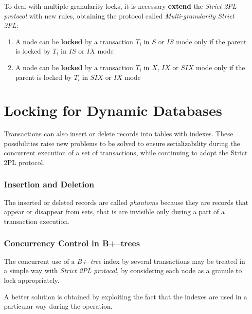 To deal with multiple granularity locks, it is necessary \textbf{extend} the \textit{Strict 2PL protocol} with new rules, obtaining the protocol called \textit{Multi-granularity Strict 2PL}:
\begin{enumerate}
    \item A node can be \textbf{locked} by a transaction $T_i$ in $S$ or $IS$ mode only if the parent is locked by $T_i$ in $IS$ or $IX$ mode
    \item A node can be \textbf{locked} by a transaction $T_i$ in $X$, $IX$ or $SIX$ mode only if the parent is locked by $T_i$ in $SIX$ or $IX$ mode
\end{enumerate}

\section{Locking for Dynamic Databases}
Transactions can also insert or delete records into tables with indexes. These possibilities raise new problems to be solved to ensure serializability during the concurrent execution of a set of transactions, while continuing to adopt the Strict 2PL protocol.

\subsubsection{Insertion and Deletion}
The inserted or deleted records are called \textit{phantoms} because they are records that appear or disappear from sets, that is are invisible only during a part of a transaction execution.

\subsubsection{Concurrency Control in B+–trees}
The concurrent use of a \textit{B+–tree} index by several transactions may be treated in a simple way with \textit{Strict 2PL protocol}, by considering each node as a granule to lock appropriately.

A better solution is obtained by exploiting the fact that the indexes are used in a particular way during the operation.